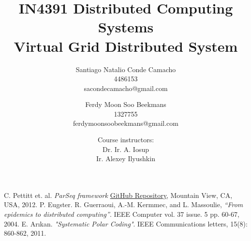 \documentclass{article}
\title{\textbf{IN4391 Distributed Computing Systems \\Virtual Grid Distributed System}}
\author{Santiago Natalio Conde Camacho  \\ 4486153\\ \small{sacondecamacho@gmail.com} \and Ferdy Moon Soo Beekmans \\1327755 \\ \small{ferdymoonsoobeekmans@gmail.com}}
\date{\small{Course instructors:} \\ Dr. Ir. A. Iosup \\ Ir. Alexey Ilyushkin}
\begin{document}
\maketitle






\begin{thebibliography}{9}

C. Pettitt et. al. \textit{ParSeq framework} {\color{magenta}\href{https://github.com/linkedin/parseq}{GitHub Repository}}, Mountain View, CA, USA, 2012.
  P. Eugster. R. Guerraoui, A.-M. Kermmec, and L. Massoulie, \textit{“From epidemics to distributed computing”}. IEEE Computer vol. 37 issue. 5 pp. 60-67, 2004.
  E. Arıkan. \textit{"Systematic Polar Coding"}. IEEE Communications letters, 15(8): 860-862, 2011.
\end{thebibliography}
\end{document}
